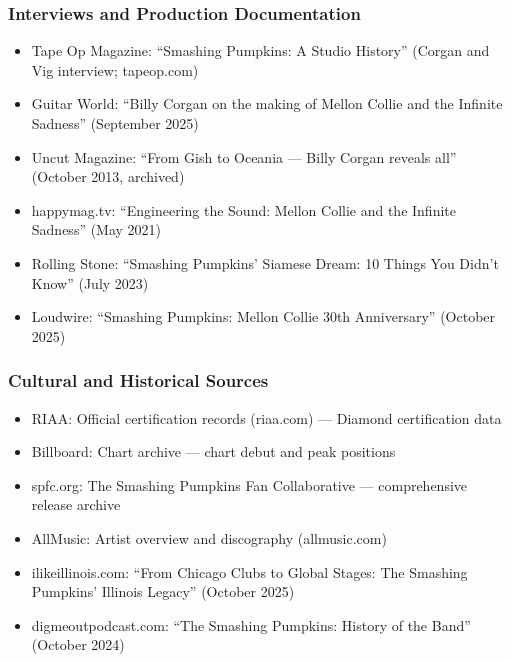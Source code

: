 \documentclass[11pt,letterpaper]{article}
\begin{document}
\subsubsection{Interviews and Production Documentation}

\begin{itemize}
  \item Tape Op Magazine: ``Smashing Pumpkins: A Studio History'' (Corgan and Vig interview; tapeop.com)
  \item Guitar World: ``Billy Corgan on the making of Mellon Collie and the Infinite Sadness'' (September 2025)
  \item Uncut Magazine: ``From Gish to Oceania --- Billy Corgan reveals all'' (October 2013, archived)
  \item happymag.tv: ``Engineering the Sound: Mellon Collie and the Infinite Sadness'' (May 2021)
  \item Rolling Stone: ``Smashing Pumpkins' Siamese Dream: 10 Things You Didn't Know'' (July 2023)
  \item Loudwire: ``Smashing Pumpkins: Mellon Collie 30th Anniversary'' (October 2025)
\end{itemize}

\subsubsection{Cultural and Historical Sources}

\begin{itemize}
  \item RIAA: Official certification records (riaa.com) --- Diamond certification data
  \item Billboard: Chart archive --- chart debut and peak positions
  \item spfc.org: The Smashing Pumpkins Fan Collaborative --- comprehensive release archive
  \item AllMusic: Artist overview and discography (allmusic.com)
  \item ilikeillinois.com: ``From Chicago Clubs to Global Stages: The Smashing Pumpkins' Illinois Legacy'' (October 2025)
  \item digmeoutpodcast.com: ``The Smashing Pumpkins: History of the Band'' (October 2024)
\end{itemize}

\end{document}
